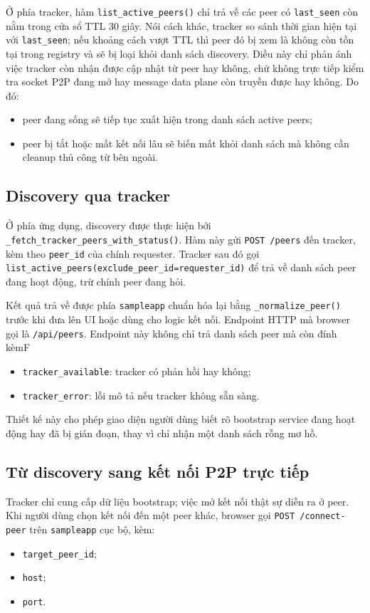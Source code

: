 Ở phía tracker, hàm \texttt{list\_active\_peers()} chỉ trả về các peer có \texttt{last\_seen} còn nằm trong cửa sổ TTL 30 giây. Nói cách khác, tracker so sánh thời gian hiện tại với \texttt{last\_seen}; nếu khoảng cách vượt TTL thì peer đó bị xem là không còn tồn tại trong registry và sẽ bị loại khỏi danh sách discovery. Điều này chỉ phản ánh việc tracker còn nhận được cập nhật từ peer hay không, chứ không trực tiếp kiểm tra socket P2P đang mở hay message data plane còn truyền được hay không. Do đó:
\begin{itemize}[leftmargin=2em]
    \item peer đang sống sẽ tiếp tục xuất hiện trong danh sách active peers;
    \item peer bị tắt hoặc mất kết nối lâu sẽ biến mất khỏi danh sách mà không cần cleanup thủ công từ bên ngoài.
\end{itemize}

\subsection{Discovery qua tracker}
Ở phía ứng dụng, discovery được thực hiện bởi \texttt{\_fetch\_tracker\_peers\_with\_status()}. Hàm này gửi \texttt{POST /peers} đến tracker, kèm theo \texttt{peer\_id} của chính requester. Tracker sau đó gọi \texttt{list\_active\_peers(exclude\_peer\_id=requester\_id)} để trả về danh sách peer đang hoạt động, trừ chính peer đang hỏi.

Kết quả trả về được phía \texttt{sampleapp} chuẩn hóa lại bằng \texttt{\_normalize\_peer()} trước khi đưa lên UI hoặc dùng cho logic kết nối. Endpoint HTTP mà browser gọi là \texttt{/api/peers}. Endpoint này không chỉ trả danh sách peer mà còn đính kèmF
\begin{itemize}[leftmargin=2em]
    \item \texttt{tracker\_available}: tracker có phản hồi hay không;
    \item \texttt{tracker\_error}: lỗi mô tả nếu tracker không sẵn sàng.
\end{itemize}

Thiết kế này cho phép giao diện người dùng biết rõ bootstrap service đang hoạt động hay đã bị gián đoạn, thay vì chỉ nhận một danh sách rỗng mơ hồ.

\subsection{Từ discovery sang kết nối P2P trực tiếp}
Tracker chỉ cung cấp dữ liệu bootstrap; việc mở kết nối thật sự diễn ra ở peer. Khi người dùng chọn kết nối đến một peer khác, browser gọi \texttt{POST /connect-peer} trên \texttt{sampleapp} cục bộ, kèm:
\begin{itemize}[leftmargin=2em]
    \item \texttt{target\_peer\_id};
    \item \texttt{host};
    \item \texttt{port}.
\end{itemize}

